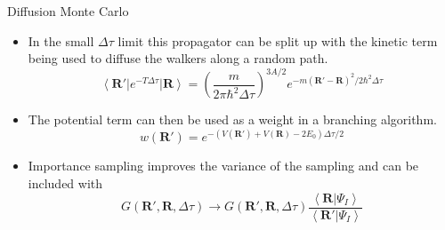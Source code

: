 \documentclass{beamer}
\newcommand{\red}[1]{{\color{red}{#1}}}
\newcommand{\ket}[1]{\left| #1 \right>}
\newcommand{\bra}[1]{\left< #1 \right|}
\newcommand{\braket}[2]{\left< #1 | #2 \right>}
\newcommand{\R}{\mathbf{R}}
\newcommand{\dt}{\Delta\tau}
\begin{document}
\begin{frame}{Diffusion Monte Carlo}
\begin{itemize}
   \item In the small $\dt$ limit this propagator can be split up with the kinetic term being used to diffuse the walkers along a random path.
   \begin{equation*}
      \bra{\R'}e^{-T\Delta \tau}\ket{\R} = \left(\frac{m}{2\pi\hbar^2\Delta\tau}\right)^{3A/2}e^{-m(\R'-\R)^2/2\hbar^2\Delta\tau}
   \end{equation*}
   \item The potential term can then be used as a weight in a branching algorithm.
   \begin{equation*}
      w(\R') = e^{-\left(V\left(\R'\right)+V\left(\R\right)-2E_0\right)\Delta\tau/2}%
   \end{equation*}
   \red{\\ Explain what branching does for you}
   \item Importance sampling improves the variance of the sampling and can be included with\red{\\ Understand what in the world the trial function is going}
   \begin{equation*}
      G(\R',\R,\Delta\tau) \rightarrow G(\R',\R,\Delta\tau)\frac{\braket{\R}{\Psi_I}}{\braket{\R'}{\Psi_I}}
   \end{equation*}
\end{itemize}
\end{frame}
\end{document}
